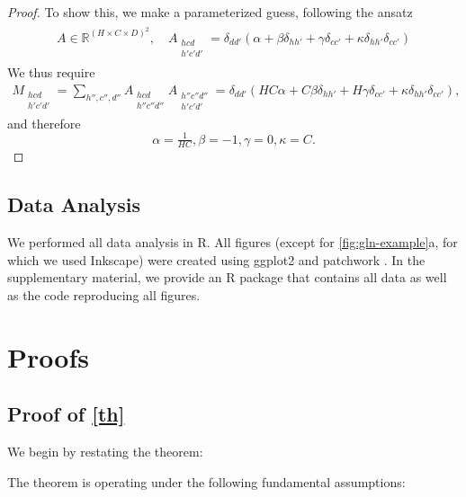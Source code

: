 \documentclass{article}
\theoremstyle{plain}
\theoremstyle{definition}
\theoremstyle{remark}
\begin{document}
\begin{proof}
To show this, we make a parameterized guess, following the ansatz
\begin{align*}
    \begin{split}
        A\in\mathbb{R}^{(H\times C\times D)^2},\quad
    A_{\substack{hcd\\h'c'd'}}=\delta_{dd'}\left(\alpha+\beta\delta_{hh'}+\gamma\delta_{cc'}+\kappa\delta_{hh'}\delta_{cc'}\right)
    \end{split}
\end{align*}
We thus require
\begin{align*}
    M_{\substack{hcd\\h'c'd'}}=\sum_{h'',c'',d''}A_{\substack{hcd\\h''c''d''}}A_{\substack{h''c''d''\\h'c'd'}}=\delta_{dd'}\left(HC\alpha+C\beta\delta_{hh'}+H\gamma\delta_{cc'}+\kappa\delta_{hh'}\delta_{cc'}\right),
\end{align*}
and therefore
\begin{equation}
    \alpha=\tfrac{1}{HC},
    \beta=-1,
    \gamma=0,
    \kappa=C.
\end{equation}
\end{proof}

\subsection{Data Analysis}

We performed all data analysis in R. \citep{r_core_team_r_2021}
All figures (except for \cref{fig:gln-example}a, for which we used Inkscape) were created using ggplot2 \citep{wickham_ggplot2_2016} and patchwork \citep{pedersen_patchwork_2020}.
In the supplementary material, we provide an R package that contains all data as well as the code reproducing all figures.

\section{Proofs}

\subsection{Proof of \cref{th}}
\label{app:proof-th}

We begin by restating the theorem:

\ghpt*

The theorem is operating under the following fundamental assumptions:
\end{document}
